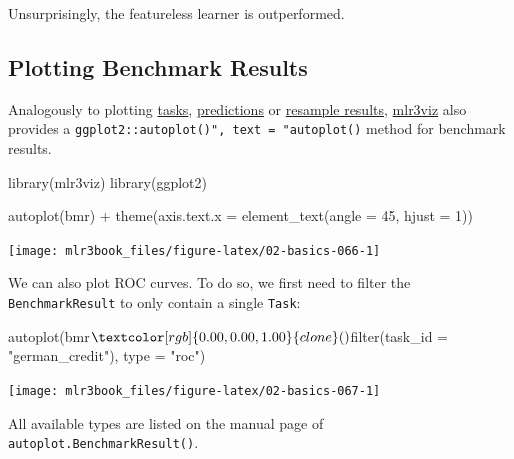 \documentclass[
  11pt,
  parskip=half,
  DIV=calc,
  BCOR=10mm,
  x11names]{scrbook}
\newenvironment{Shaded}{}{}
\newcommand{\DataTypeTok}[1]{#1}
\newcommand{\DecValTok}[1]{#1}
\newcommand{\KeywordTok}[1]{\textcolor[rgb]{0.00,0.00,1.00}{#1}}
\newcommand{\NormalTok}[1]{#1}
\newcommand{\OperatorTok}[1]{#1}
\newcommand{\StringTok}[1]{\textcolor[rgb]{0.00,0.50,0.50}{#1}}
\begin{document}
Unsurprisingly, the featureless learner is outperformed.

\hypertarget{autoplot-benchmarkresult}{%
\subsection{Plotting Benchmark Results}\label{autoplot-benchmarkresult}}

Analogously to plotting \protect\hyperlink{autoplot-task}{tasks}, \protect\hyperlink{autoplot-prediction}{predictions} or \protect\hyperlink{autoplot-resampleresult}{resample results}, \href{https://mlr3viz.mlr-org.com}{mlr3viz} also provides a \texttt{ggplot2::autoplot()",\ text\ =\ "autoplot()} method for benchmark results.

\begin{Shaded}
\begin{Highlighting}[]
\KeywordTok{library}\NormalTok{(mlr3viz)}
\KeywordTok{library}\NormalTok{(ggplot2)}

\KeywordTok{autoplot}\NormalTok{(bmr) }\OperatorTok{+}\StringTok{ }\KeywordTok{theme}\NormalTok{(}\DataTypeTok{axis.text.x =} \KeywordTok{element_text}\NormalTok{(}\DataTypeTok{angle =} \DecValTok{45}\NormalTok{, }
  \DataTypeTok{hjust =} \DecValTok{1}\NormalTok{))}
\end{Highlighting}
\end{Shaded}

\begin{center}\texttt{[image: mlr3book\_files/figure-latex/02-basics-066-1]} \end{center}

We can also plot ROC curves.
To do so, we first need to filter the \texttt{BenchmarkResult} to only contain a single \texttt{Task}:

\begin{Shaded}
\begin{Highlighting}[]
\KeywordTok{autoplot}\NormalTok{(bmr}\OperatorTok{$}\KeywordTok{clone}\NormalTok{()}\OperatorTok{$}\KeywordTok{filter}\NormalTok{(}\DataTypeTok{task_id =} \StringTok{"german_credit"}\NormalTok{), }\DataTypeTok{type =} \StringTok{"roc"}\NormalTok{)}
\end{Highlighting}
\end{Shaded}

\begin{center}\texttt{[image: mlr3book\_files/figure-latex/02-basics-067-1]} \end{center}

All available types are listed on the manual page of \texttt{autoplot.BenchmarkResult()}.
\end{document}

